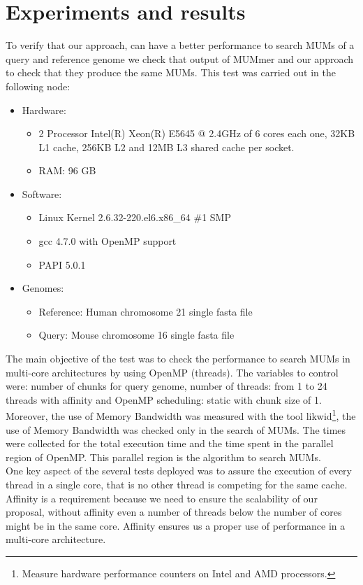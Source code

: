 \documentclass[3p,times]{elsarticle}
\begin{document}
\section{Experiments and results}
To verify that our approach, can have a better performance to search MUMs of a query and reference genome we check that output of MUMmer and our approach to check that they produce the same MUMs. This test was carried out in the following node:
\begin{itemize}
\item Hardware:  
\begin{itemize}
\item 2 Processor Intel(R) Xeon(R) E5645 @ 2.4GHz of 6 cores each one, 32KB L1 cache, 256KB L2 and 12MB L3 shared cache per socket.
\item RAM: 96 GB
\end{itemize} 
\item  Software: 
\begin{itemize}
\item Linux Kernel 2.6.32-220.el6.x86\_64 \#1 SMP
\item gcc 4.7.0 with OpenMP support
\item PAPI 5.0.1
\end{itemize}  
\item Genomes:
  \begin{itemize}
    \item Reference: Human chromosome 21 single fasta file
    \item Query: Mouse chromosome 16 single fasta file
  \end{itemize}
\end{itemize}
The main objective of the test was to check the performance to search MUMs in multi-core architectures by using OpenMP (threads). The variables to control were: number of chunks for query genome, number of threads: from 1 to 24 threads with affinity and OpenMP scheduling: static with chunk size of 1.\\
Moreover, the use of Memory Bandwidth was measured with the tool likwid\footnote{Measure hardware performance counters on Intel and AMD processors.}, the use of Memory Bandwidth was checked only in the search of MUMs. The times were collected for the total execution time and the time spent in the parallel region of OpenMP. This parallel region is the algorithm to search MUMs.\\
One key aspect of the several tests deployed was to assure the execution of every thread in a single core, that is no other thread is competing for the same cache. Affinity is a requirement because we need to ensure the scalability of our proposal, without affinity even a number of threads below the number of cores might be in the same core. Affinity ensures us a proper use of performance in a multi-core architecture.\\
\end{document}
